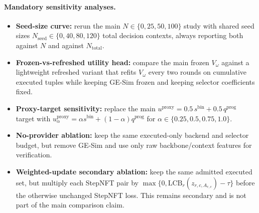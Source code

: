 \documentclass[10pt]{article}
\theoremstyle{plain}
\theoremstyle{definition}
\theoremstyle{remark}
\newcommand{\LCB}{\mathrm{LCB}}
\begin{document}
\paragraph{Mandatory sensitivity analyses.}
\begin{itemize}
    \item \textbf{Seed-size curve:} rerun the main $N\in\{0,25,50,100\}$ study with shared seed sizes $N_{\mathrm{seed}}\in\{0,40,80,120\}$ total decision contexts, always reporting both against $N$ and against $N_{\mathrm{total}}$.
    \item \textbf{Frozen-vs-refreshed utility head:} compare the main frozen $V_{\omega}$ against a lightweight refreshed variant that refits $V_{\omega}$ every two rounds on cumulative executed tuples while keeping GE-Sim frozen and keeping selector coefficients fixed.
    \item \textbf{Proxy-target sensitivity:} replace the main $u^{\mathrm{proxy}}=0.5\,s^{\mathrm{bin}}+0.5\,q^{\mathrm{prog}}$ target with $u^{\mathrm{proxy}}_{\alpha}=\alpha s^{\mathrm{bin}}+(1-\alpha)q^{\mathrm{prog}}$ for $\alpha\in\{0.25,0.5,0.75,1.0\}$.
    \item \textbf{No-provider ablation:} keep the same executed-only backend and selector budget, but remove GE-Sim and use only raw backbone/context features for verification.
    \item \textbf{Weighted-update secondary ablation:} keep the same admitted executed set, but multiply each StepNFT pair by $\max\{0,\LCB_r(z_{r,c,A_{r,c}})-\tau\}$ before the otherwise unchanged StepNFT loss. This remains secondary and is not part of the main comparison claim.
\end{itemize}
\end{document}
